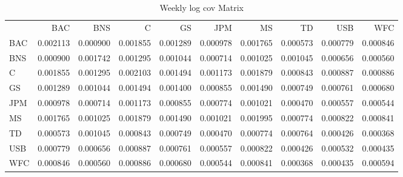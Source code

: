 \documentclass{article}
\begin{document}
\begin{table}
\caption{Weekly log cov Matrix}
\label{tab:weekly_log_cov}
\begin{tabular}{lrrrrrrrrr}
 & BAC & BNS & C & GS & JPM & MS & TD & USB & WFC \\
BAC & 0.002113 & 0.000900 & 0.001855 & 0.001289 & 0.000978 & 0.001765 & 0.000573 & 0.000779 & 0.000846 \\
BNS & 0.000900 & 0.001742 & 0.001295 & 0.001044 & 0.000714 & 0.001025 & 0.001045 & 0.000656 & 0.000560 \\
C & 0.001855 & 0.001295 & 0.002103 & 0.001494 & 0.001173 & 0.001879 & 0.000843 & 0.000887 & 0.000886 \\
GS & 0.001289 & 0.001044 & 0.001494 & 0.001400 & 0.000855 & 0.001490 & 0.000749 & 0.000761 & 0.000680 \\
JPM & 0.000978 & 0.000714 & 0.001173 & 0.000855 & 0.000774 & 0.001021 & 0.000470 & 0.000557 & 0.000544 \\
MS & 0.001765 & 0.001025 & 0.001879 & 0.001490 & 0.001021 & 0.001995 & 0.000774 & 0.000822 & 0.000841 \\
TD & 0.000573 & 0.001045 & 0.000843 & 0.000749 & 0.000470 & 0.000774 & 0.000764 & 0.000426 & 0.000368 \\
USB & 0.000779 & 0.000656 & 0.000887 & 0.000761 & 0.000557 & 0.000822 & 0.000426 & 0.000532 & 0.000435 \\
WFC & 0.000846 & 0.000560 & 0.000886 & 0.000680 & 0.000544 & 0.000841 & 0.000368 & 0.000435 & 0.000594 \\
\end{tabular}
\end{table}
\end{document}
